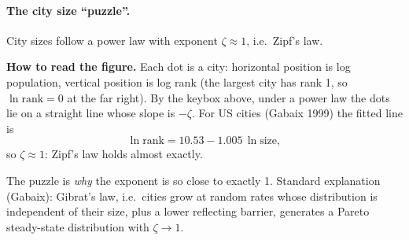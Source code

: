 \paragraph{The city size ``puzzle''.} City sizes follow a power law with exponent $\zeta\approx1$, i.e.\ Zipf's law.
\begin{center}
\end{center}
\textbf{How to read the figure.} Each dot is a city: horizontal position is log population, vertical position is log rank (the largest city has rank 1, so $\ln\text{rank}=0$ at the far right). By the keybox above, under a power law the dots lie on a straight line whose slope is $-\zeta$. For US cities (Gabaix 1999) the fitted line is
\begin{equation*}
  \ln\text{rank}=10.53-1.005\,\ln\text{size},
\end{equation*}
so $\zeta\approx1$: Zipf's law holds almost exactly.
\begin{tipbox}
The puzzle is \emph{why} the exponent is so close to exactly 1. Standard explanation (Gabaix): Gibrat's law, i.e.\ cities grow at random rates whose distribution is independent of their size, plus a lower reflecting barrier, generates a Pareto steady-state distribution with $\zeta\to1$.
\end{tipbox}
